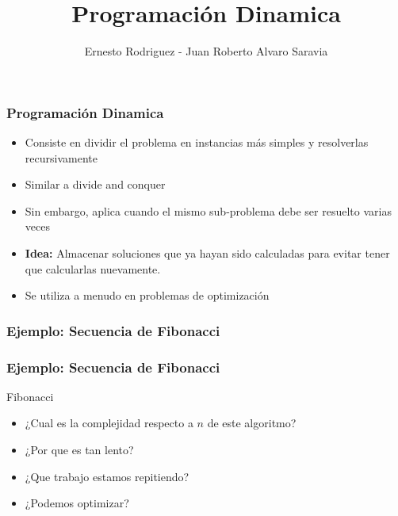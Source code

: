 \documentclass{beamer}
\title[Dinamica]{Programaci\'on Dinamica}
\author{Ernesto Rodriguez - Juan Roberto Alvaro Saravia}
\institute{
    Universidad Francisco Marroquin \\
    \medskip \textit{ernestorodriguez@ufm.edu - juanalvarado@ufm.edu}
}
\date[\today]{}
\begin{document}
\begin{frame}
\titlepage
\end{frame}


\begin{frame}
    \frametitle{Programaci\'on Dinamica}
    \begin{itemize}
        \item{Consiste en dividir el problema en instancias m\'as simples
        y resolverlas recursivamente}
        \item{Similar a divide and conquer}
        \item{Sin embargo, aplica cuando el mismo sub-problema debe ser
        resuelto varias veces}
        \item{{\bf Idea:} Almacenar soluciones que ya hayan sido
        calculadas para evitar tener que calcularlas nuevamente.}
        \item{Se utiliza a menudo en problemas de optimizaci\'on}
    \end{itemize}
\end{frame}

\begin{frame}
    \frametitle{Ejemplo: Secuencia de Fibonacci}
\end{frame}

\begin{frame}
    \frametitle{Ejemplo: Secuencia de Fibonacci}
    \begin{algorithm}[H]
        \caption{Fibonacci}
        \begin{algorithmic}[1]
        \EndIf
        \EndIf
        \EndProcedure
        \end{algorithmic}
    \end{algorithm}
\begin{itemize}
    \item{¿Cual es la complejidad respecto a $n$ de este algoritmo?}
    \item{¿Por que es tan lento?}
    \item{¿Que trabajo estamos repitiendo?}
    \item{¿Podemos optimizar?}
\end{itemize}

\end{frame}
\end{document}
